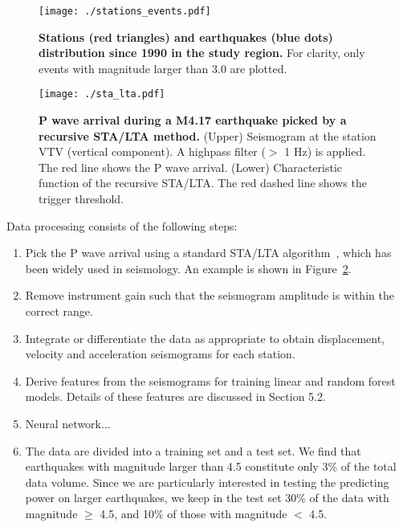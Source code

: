 \documentclass{article} %
\begin{document}

\begin{figure}[ht!]
	\centering
	\texttt{[image: ./stations\_events.pdf]}
	\caption{{\bf Stations (red triangles) and earthquakes (blue dots) distribution since 1990 in the study region.} For clarity, only events with magnitude larger than 3.0 are plotted.}
	\label{stations_events} %
\end{figure}

\begin{figure}[ht!]
	\centering
	\texttt{[image: ./sta\_lta.pdf]}
	\caption{{\bf P wave arrival during a M4.17 earthquake picked by a recursive STA/LTA method.} (Upper) Seismogram at the station VTV (vertical component). A highpass filter ($>$ 1 Hz) is applied. The red line shows the P wave arrival. (Lower) Characteristic function of the recursive STA/LTA. The red dashed line shows the trigger threshold.}\label{sta_lta} %
\end{figure}

Data processing consists of the following steps:

\begin{enumerate}
\item Pick the P wave arrival using a standard STA/LTA algorithm~\cite{Withers1998}, which has been widely used in seismology. An example is shown in Figure~\ref{sta_lta}. 
\item Remove instrument gain such that the seismogram amplitude is within the correct range.
\item Integrate or differentiate the data as appropriate to obtain displacement, velocity and acceleration seismograms for each station.
\item Derive features from the seismograms for training linear and random forest models. Details of these features are discussed in Section 5.2.   

\item Neural network...

\item The data are divided into a training set and a test set. We find that earthquakes with magnitude larger than 4.5 constitute only 3\% of the total data volume. Since we are particularly interested in testing the predicting power on larger earthquakes, we keep in the test set 30\% of the data with magnitude $\geq$ 4.5, and 10\% of those with magnitude $<$ 4.5.

\end{enumerate}
\end{document}
